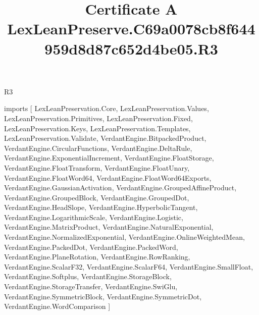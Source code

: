 \begin{lexlean}{R3}
\title{Certificate A LexLeanPreserve.C69a0078cb8f644959d8d87c652d4be05.R3}
\begin{coremodule}
imports [
  LexLeanPreservation.Core,
  LexLeanPreservation.Values,
  LexLeanPreservation.Primitives,
  LexLeanPreservation.Fixed,
  LexLeanPreservation.Keys,
  LexLeanPreservation.Templates,
  LexLeanPreservation.Validate,
  VerdantEngine.BitpackedProduct,
  VerdantEngine.CircularFunctions,
  VerdantEngine.DeltaRule,
  VerdantEngine.ExponentialIncrement,
  VerdantEngine.FloatStorage,
  VerdantEngine.FloatTransform,
  VerdantEngine.FloatUnary,
  VerdantEngine.FloatWord64,
  VerdantEngine.FloatWord64Exports,
  VerdantEngine.GaussianActivation,
  VerdantEngine.GroupedAffineProduct,
  VerdantEngine.GroupedBlock,
  VerdantEngine.GroupedDot,
  VerdantEngine.HeadSlope,
  VerdantEngine.HyperbolicTangent,
  VerdantEngine.LogarithmicScale,
  VerdantEngine.Logistic,
  VerdantEngine.MatrixProduct,
  VerdantEngine.NaturalExponential,
  VerdantEngine.NormalizedExponential,
  VerdantEngine.OnlineWeightedMean,
  VerdantEngine.PackedDot,
  VerdantEngine.PackedWord,
  VerdantEngine.PlaneRotation,
  VerdantEngine.RowRanking,
  VerdantEngine.ScalarF32,
  VerdantEngine.ScalarF64,
  VerdantEngine.SmallFloat,
  VerdantEngine.Softplus,
  VerdantEngine.StorageBlock,
  VerdantEngine.StorageTransfer,
  VerdantEngine.SwiGlu,
  VerdantEngine.SymmetricBlock,
  VerdantEngine.SymmetricDot,
  VerdantEngine.WordComparison
]


\end{coremodule}
\end{lexlean}
